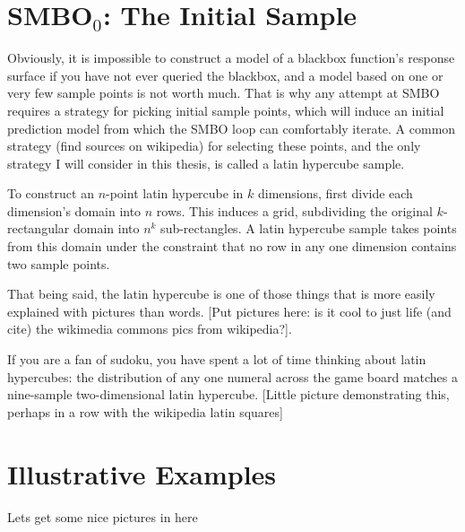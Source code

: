 \section{SMBO$_0$: The Initial Sample}

Obviously, it is impossible to construct a model of a blackbox function's response surface if you have not ever queried the blackbox, and a model based on one or very few sample points is not worth much. That is why any attempt at SMBO requires a strategy for picking initial sample points, which will induce an initial prediction model from which the SMBO loop can comfortably iterate. A common strategy (find sources on wikipedia) for selecting these points, and the only strategy I will consider in this thesis, is called a latin hypercube sample.

To construct an $n$-point latin hypercube in $k$ dimensions, first divide each dimension's domain into $n$ rows. This induces a grid, subdividing the original $k$-rectangular domain into $n^k$ sub-rectangles. A latin hypercube sample takes points from this domain under the constraint that no row in any one dimension contains two sample points.

That being said, the latin hypercube is one of those things that is more easily explained with pictures than words. [Put pictures here: is it cool to just life (and cite) the wikimedia commons pics from wikipedia?].

If you are a fan of sudoku, you have spent a lot of time thinking about latin hypercubes: the distribution of any one numeral across the game board matches a nine-sample two-dimensional latin hypercube. [Little picture demonstrating this, perhaps in a row with the wikipedia latin squares]


\section{Illustrative Examples}
Lets get some nice pictures in here




